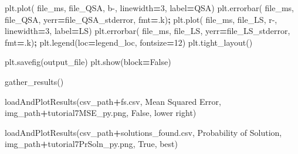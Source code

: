 \documentclass[12pt, twoside]{amherstthesis}
\newenvironment{Shaded}{\begin{snugshade}}{\end{snugshade}}
\newcommand{\DecValTok}[1]{\textcolor[rgb]{0.00,0.00,0.81}{#1}}
\newcommand{\NormalTok}[1]{#1}
\newcommand{\OperatorTok}[1]{\textcolor[rgb]{0.81,0.36,0.00}{\textbf{#1}}}
\newcommand{\StringTok}[1]{\textcolor[rgb]{0.31,0.60,0.02}{#1}}
\newcommand{\VariableTok}[1]{\textcolor[rgb]{0.00,0.00,0.00}{#1}}
\begin{document}
\begin{Shaded}
\begin{Highlighting}[]
\NormalTok{    plt.plot(     file\_ms,     file\_QSA, }\StringTok{\textquotesingle{}b{-}\textquotesingle{}}\NormalTok{, linewidth}\OperatorTok{=}\DecValTok{3}\NormalTok{, label}\OperatorTok{=}\StringTok{\textquotesingle{}QSA\textquotesingle{}}\NormalTok{)}
\NormalTok{    plt.errorbar( file\_ms,     file\_QSA, yerr}\OperatorTok{=}\NormalTok{file\_QSA\_stderror, fmt}\OperatorTok{=}\StringTok{\textquotesingle{}.k\textquotesingle{}}\NormalTok{)}\OperatorTok{;}
\NormalTok{    plt.plot(     file\_ms,     file\_LS,  }\StringTok{\textquotesingle{}r{-}\textquotesingle{}}\NormalTok{, linewidth}\OperatorTok{=}\DecValTok{3}\NormalTok{, label}\OperatorTok{=}\StringTok{\textquotesingle{}LS\textquotesingle{}}\NormalTok{)}
\NormalTok{    plt.errorbar( file\_ms,     file\_LS,  yerr}\OperatorTok{=}\NormalTok{file\_LS\_stderror, fmt}\OperatorTok{=}\StringTok{\textquotesingle{}.k\textquotesingle{}}\NormalTok{)}\OperatorTok{;}
\NormalTok{    plt.legend(loc}\OperatorTok{=}\NormalTok{legend\_loc, fontsize}\OperatorTok{=}\DecValTok{12}\NormalTok{)}
\NormalTok{    plt.tight\_layout()}

\NormalTok{    plt.savefig(output\_file)}
\NormalTok{    plt.show(block}\OperatorTok{=}\VariableTok{False}\NormalTok{)}
\end{Highlighting}
\end{Shaded}
\begin{Shaded}
\begin{Highlighting}[]
\NormalTok{gather\_results()}
\end{Highlighting}
\end{Shaded}
\begin{Shaded}
\begin{Highlighting}[]
\NormalTok{loadAndPlotResults(csv\_path}\OperatorTok{+}\StringTok{\textquotesingle{}fs.csv\textquotesingle{}}\NormalTok{, }
\StringTok{\textquotesingle{}Mean Squared Error\textquotesingle{}}\NormalTok{, }
\NormalTok{img\_path}\OperatorTok{+}\StringTok{\textquotesingle{}tutorial7MSE\_py.png\textquotesingle{}}\NormalTok{, }
\VariableTok{False}\NormalTok{, }
\StringTok{\textquotesingle{}lower right\textquotesingle{}}\NormalTok{)}
\end{Highlighting}
\end{Shaded}
\begin{Shaded}
\begin{Highlighting}[]
\NormalTok{loadAndPlotResults(csv\_path}\OperatorTok{+}\StringTok{\textquotesingle{}solutions\_found.csv\textquotesingle{}}\NormalTok{, }
\StringTok{\textquotesingle{}Probability of Solution\textquotesingle{}}\NormalTok{,   }
\NormalTok{img\_path}\OperatorTok{+}\StringTok{\textquotesingle{}tutorial7PrSoln\_py.png\textquotesingle{}}\NormalTok{,  }
\VariableTok{True}\NormalTok{,  }
\StringTok{\textquotesingle{}best\textquotesingle{}}\NormalTok{)}
\end{Highlighting}
\end{Shaded}
\end{document}
